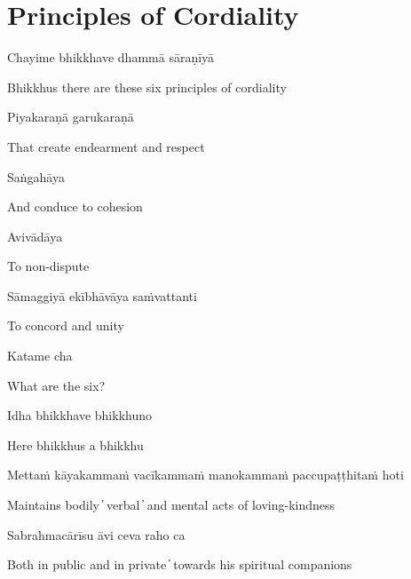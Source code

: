 \section*{Principles of Cordiality}

\begin{leader}
\end{leader}

Chayime bhikkhave dhammā sāraṇīyā

\begin{cprenglish}
Bhikkhus there are these six principles of cordiality
\end{cprenglish}

Piyakaraṇā garukaraṇā

\begin{cprenglish}
That create endearment and respect
\end{cprenglish}

Saṅgahāya

\begin{cprenglish}
And conduce to cohesion
\end{cprenglish}

Avivādāya

\begin{cprenglish}
To non-dispute
\end{cprenglish}

Sāmaggiyā ekībhāvāya saṁvattanti

\begin{cprenglish}
To concord and unity
\end{cprenglish}

Katame cha

\begin{cprenglish}
What are the six?
\end{cprenglish}

Idha bhikkhave bhikkhuno

\begin{cprenglish}
Here bhikkhus a bhikkhu
\end{cprenglish}

Mettaṁ kāyakammaṁ vacīkammaṁ manokammaṁ paccupaṭṭhitaṁ hoti

\begin{cprenglish}
Maintains bodily  ̓  verbal  ̓  and mental acts of loving-kindness
\end{cprenglish}

Sabrahmacārīsu āvi ceva raho ca

\begin{cprenglish}
Both in public and in private  ̓  towards his spiritual companions
\end{cprenglish}

